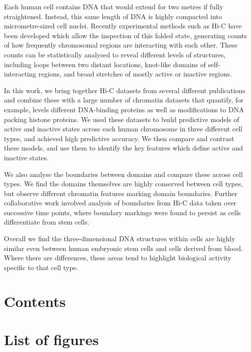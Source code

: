 \documentclass[a4paper,11pt,twoside,toc=listof]{scrbook}
\begin{document}
Each human cell contains DNA that would extend for two metres if fully straightened. Instead, this same length of DNA is highly compacted into micrometre-sized cell nuclei. Recently experimental methods such as Hi-C have been developed which allow the inspection of this folded state, generating counts of how frequently chromosomal regions are interacting with each other. These counts can be statistically analysed to reveal different levels of structures, including loops between two distant locations, knot-like domains of self-interacting regions, and broad stretches of mostly active or inactive regions. 

In this work, we bring together Hi-C datasets from several different publications and combine these with a large number of chromatin datasets that quantify, for example, levels different DNA-binding proteins as well as modifications to DNA packing histone proteins. We used these datasets to build predictive models of active and inactive states across each human chromosome in three different cell types, and achieved high predictive accuracy. We then compare and contrast these models, and use them to identify the key features which define active and inactive states. 

We also analyse the boundaries between domains and compare these across cell types. We find the domains themselves are highly conserved between cell types, but observe different chromatin features marking domain boundaries. Further collaborative work involved analysis of boundaries from Hi-C data taken over successive time points, where boundary markings were found to persist as cells differentiate from stem cells.

Overall we find the three-dimensional DNA structures within cells are highly similar even between human embryonic stem cells and cells derived from blood. Where there are differences, these areas tend to highlight biological activity specific to that cell type.

\clearpage

\chapter{Contents}

\makeatletter
{}
\makeatother
\clearpage

\chapter{List of figures}
\end{document}
